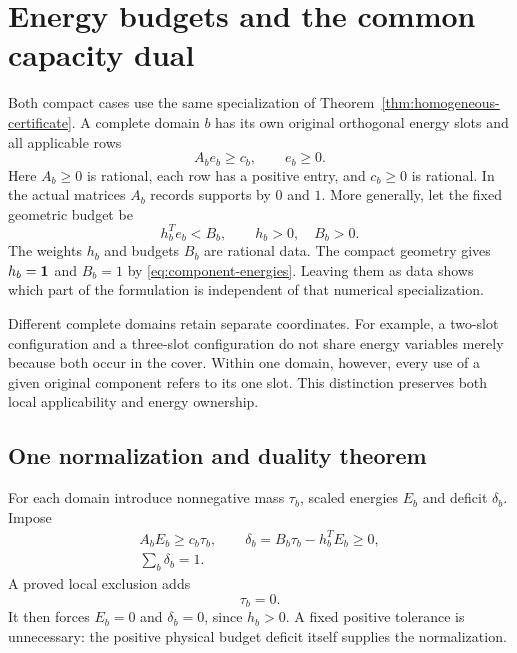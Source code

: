 \section{Energy budgets and the common capacity dual}
\label{sec:energy-framework}

Both compact cases use the same specialization of
Theorem~\ref{thm:homogeneous-certificate}. A complete domain $b$ has
its own original orthogonal energy slots and all applicable rows
\begin{equation}\label{eq:branch-energy}
                  A_be_b\ge c_b,\qquad e_b\ge0.
\end{equation}
Here $A_b\ge0$ is rational, each row has a positive entry, and
$c_b\ge0$ is rational. In the actual matrices $A_b$ records supports
by $0$ and $1$. More generally, let the fixed geometric budget be
\begin{equation}\label{eq:general-energy-budget}
              h_b^Te_b<B_b,\qquad h_b>0,\quad B_b>0.
\end{equation}
The weights $h_b$ and budgets $B_b$ are rational data.
The compact geometry gives $h_b=\mathbf 1$ and $B_b=1$ by
\eqref{eq:component-energies}. Leaving them as data shows which part
of the formulation is independent of that numerical specialization.

Different complete domains retain separate coordinates. For example,
a two-slot configuration and a three-slot configuration do not share
energy variables merely because both occur in the cover. Within one
domain, however, every use of a given original component refers to
its one slot. This distinction preserves both local applicability and
energy ownership.

\subsection{One normalization and duality theorem}

For each domain introduce nonnegative mass $\tau_b$, scaled energies
$E_b$ and deficit $\delta_b$. Impose
\begin{equation}\label{eq:budget-deficit}
 \begin{gathered}
 A_bE_b\ge c_b\tau_b,\qquad
 \delta_b=B_b\tau_b-h_b^TE_b\ge0,\\
                         \sum_b\delta_b=1.
 \end{gathered}
\end{equation}
A proved local exclusion adds
\begin{equation}\label{eq:excluded-mass}
                              \tau_b=0.
\end{equation}
It then forces $E_b=0$ and $\delta_b=0$, since $h_b>0$.
A fixed positive tolerance is unnecessary: the positive physical
budget deficit itself supplies the normalization.

